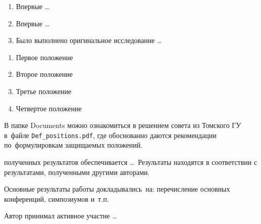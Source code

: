 {\novelty}
\begin{enumerate}
  \item Впервые \ldots
  \item Впервые \ldots
  \item Было выполнено оригинальное исследование \ldots
\end{enumerate}



{}
\begin{enumerate}
  \item Первое положение
  \item Второе положение
  \item Третье положение
  \item Четвертое положение
\end{enumerate}
В папке Documents можно ознакомиться в решением совета из Томского ГУ
в~файле \verb+Def_positions.pdf+, где обоснованно даются рекомендации
по~формулировкам защищаемых положений. 

{\reliability} полученных результатов обеспечивается \ldots \ Результаты находятся в соответствии с результатами, полученными другими авторами.


{\probation}
Основные результаты работы докладывались~на:
перечисление основных конференций, симпозиумов и~т.\:п.

{\contribution} Автор принимал активное участие \ldots



